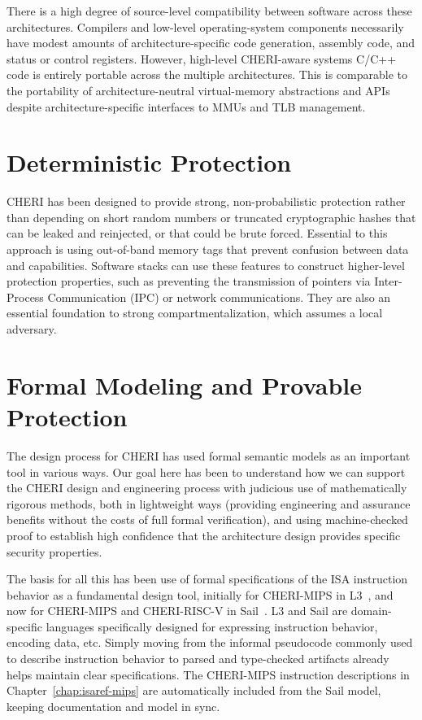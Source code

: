 There is a high degree of source-level compatibility between software across
these architectures.
Compilers and low-level operating-system components necessarily have modest
amounts of architecture-specific code generation, assembly code, and status
or control registers.
However, high-level CHERI-aware systems C/C++ code is entirely portable across
the multiple architectures.
This is comparable to the portability of architecture-neutral virtual-memory
abstractions and APIs despite architecture-specific interfaces to MMUs and
TLB management.

\section{Deterministic Protection}

CHERI has been designed to provide strong, non-probabilistic protection rather
than depending on short random numbers or truncated cryptographic hashes that
can be leaked and reinjected, or that could be brute forced.
Essential to this approach is using out-of-band memory tags that prevent
confusion between data and capabilities.
Software stacks can use these features to construct higher-level protection
properties, such as preventing the transmission of pointers via Inter-Process
Communication (IPC) or network communications.
They are also an essential foundation to strong compartmentalization, which
assumes a local adversary.

\section{Formal Modeling and Provable Protection}

The design process for CHERI has used formal semantic models as an
important tool  in
various ways.
%
Our
goal here has been to understand how we can support the CHERI design
and engineering process with judicious use of mathematically rigorous
methods, both in lightweight ways (providing engineering and assurance
benefits without the costs of full formal verification), and using
machine-checked proof to establish high confidence that the
architecture design provides specific security properties.

The basis for all this has been use of formal specifications of the
ISA instruction behavior as a fundamental design tool, initially for
CHERI-MIPS in L3~\cite{Fox2015}, and now for CHERI-MIPS and
CHERI-RISC-V in Sail~\cite{sail-popl2019}.  L3 and Sail are
domain-specific languages specifically designed for expressing
instruction behavior, encoding data, etc.
Simply moving from the informal pseudocode commonly used to describe
instruction behavior to parsed and type-checked
artifacts already helps maintain clear specifications.
The CHERI-MIPS instruction descriptions in Chapter~\ref{chap:isaref-mips}
are automatically included from the Sail model, keeping documentation
and model in sync.

